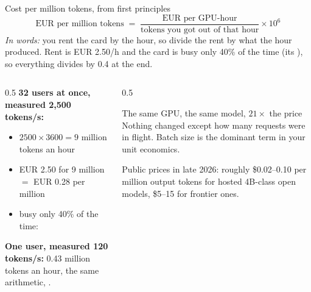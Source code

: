 \documentclass[aspectratio=169,10pt]{beamer}
\begin{document}
\fi
\begin{frame}{Cost per million tokens, from first principles}
  \small
  \[
    \text{EUR per million tokens} \;=\;
    \frac{\text{EUR per GPU-hour}}{\text{tokens you got out of that hour}}
    \times 10^{6}
  \]
  \emph{In words:} you rent the card by the hour, so divide the rent by what
  the hour produced. Rent is EUR 2.50/h and the card is busy only 40\% of the
  time (its ), so everything divides by 0.4 at the end.
  \begin{columns}[T]
    \begin{column}{0.5\textwidth}
      \textbf{32 users at once, measured 2{,}500 tokens/s:}
      \begin{itemize}
        \item $2500 \times 3600 = 9$ million tokens an hour
        \item EUR 2.50 for 9 million $=$ EUR 0.28 per million
        \item busy only 40\% of the time: 
      \end{itemize}
      \textbf{One user, measured 120 tokens/s:} 0.43 million tokens an hour,
      the same arithmetic, .
    \end{column}
    \begin{column}{0.5\textwidth}
      \begin{block}{The same GPU, the same model, $21\times$ the price}
        \small
        Nothing changed except how many requests were in flight. Batch size is
        the dominant term in your unit economics.
      \end{block}
      \vspace{0.3em}

      Public prices in late 2026: roughly \$0.02--0.10 per million output
      tokens for hosted 4B-class open models, \$5--15 for frontier ones.
    \end{column}
  \end{columns}
\end{frame}
\end{document}
